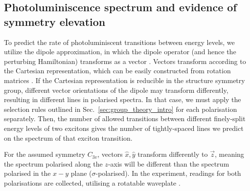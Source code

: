 \subsection[Photoluminiscence spectrum]{Photoluminiscence spectrum and evidence of symmetry elevation}

To predict the rate of photoluminiscent transitions between energy levels, we utilize the dipole approximation, in which the dipole operator (and hence the perturbing Hamiltonian) transforms as a vector \cite[p.~13]{karlsson}. Vectors transform according to the Cartesian representation, which can be easily constructed from rotation matrices \cite[p.~160]{wigner}. If the Cartesian representation is reducible in the structure symmetry group, different vector orientations of the dipole may transform differently, resulting in different lines in polarised spectra. In that case, we must apply the selection rules outlined in Sec.~\ref{sec:group_theory_intro} for each polarisation separately. Then, the number of allowed transitions between different finely-split energy levels of two excitons gives the number of tightly-spaced lines we predict on the spectrum of that exciton transition.

For the assumed symmetry $C_{3v}$, vectors $\hat{x},\hat{y}$ transform differently to $\vec{z}$, meaning the spectrum polarised along the $z$-axis will be different than the spectrum polarised in the $x-y$ plane ($\sigma$-polarised). In the experiment, readings for both polarisations are collected, utilising a rotatable waveplate \cite[p.~2]{karlsson}.

